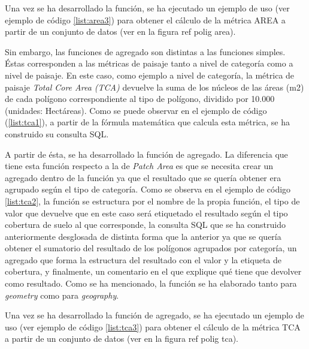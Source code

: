 \label{list:area2}

Una vez se ha desarrollado la función, se ha ejecutado un ejemplo de uso (ver ejemplo de código \ref{list:area3}) para obtener el cálculo de la métrica AREA a partir de un conjunto de datos (ver en la figura ref polig area).

\label{list:area3}

Sin embargo, las funciones de agregado son distintas a las funciones simples. Éstas corresponden a las métricas de paisaje tanto a nivel de categoría como a nivel de paisaje. En este caso, como ejemplo a nivel de categoría, la métrica de paisaje \textit{Total Core Area (TCA)} devuelve la suma de los núcleos de las áreas (m2) de cada polígono correspondiente al tipo de polígono, dividido por 10.000 (unidades: Hectáreas). Como se puede observar en el ejemplo de código (\ref{list:tca1}), a partir de la fórmula matemática que calcula esta métrica, se ha construido su consulta SQL.

\label{list:tca1}

A partir de ésta, se ha desarrollado la función de agregado. La diferencia que tiene esta función respecto a la de \textit{Patch Area} es que se necesita crear un agregado dentro de la función ya que el resultado que se quería obtener era agrupado según el tipo de categoría. Como se observa en el ejemplo de código \ref{list:tca2}, la función se estructura por el nombre de la propia función, el tipo de valor que devuelve que en este caso será etiquetado el resultado según el tipo cobertura de suelo al que corresponde, la consulta SQL que se ha construido anteriormente desglosada de distinta forma que la anterior ya que se quería obtener el sumatorio del resultado de los polígonos agrupados por categoría, un agregado que forma la estructura del resultado con el valor y la etiqueta de cobertura, y finalmente, un comentario en el que explique qué tiene que devolver como resultado. Como se ha mencionado, la función se ha elaborado tanto para \textit{geometry} como para \textit{geography}.

\label{list:tca2}

Una vez se ha desarrollado la función de agregado, se ha ejecutado un ejemplo de uso (ver ejemplo de código \ref{list:tca3}) para obtener el cálculo de la métrica TCA a partir de un conjunto de datos (ver en la figura ref polig tca).

